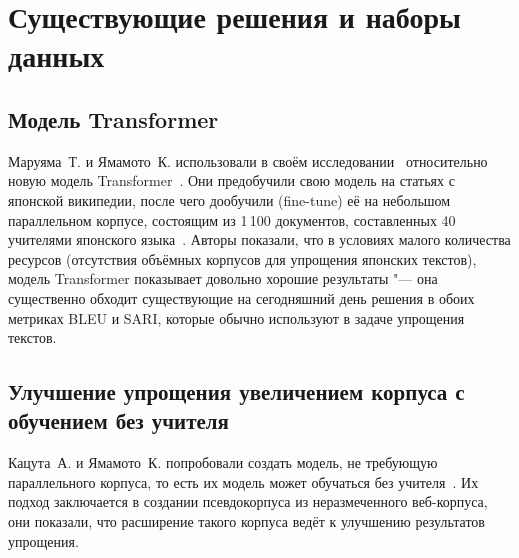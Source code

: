 \section{Существующие решения и наборы данных}








\subsection{Модель Transformer}


Маруяма~Т. и Ямамото~К. использовали в своём исследовании~\cite{Transformer2019} относительно новую модель Transformer~\cite{vaswani2017attention}.
Они предобучили свою модель на статьях с японской википедии, после чего дообучили (fine-tune) её на небольшом параллельном корпусе, состоящим из 1\,100 документов, составленных 40 учителями японского языка~\cite{moku-yamamoto-2012-automatic}.
Авторы показали, что в условиях малого количества ресурсов (отсутствия объёмных корпусов для упрощения японских текстов), модель Transformer показывает довольно хорошие результаты "--- она существенно обходит существующие на сегодняшний день решения в обоих метриках BLEU и SARI, которые обычно используют в задаче упрощения текстов.


\subsection{Улучшение упрощения увеличением корпуса с обучением без учителя}


Кацута~А. и Ямамото~К. попробовали создать модель, не требующую параллельного корпуса, то есть их модель может обучаться без учителя~\cite{Unsupervised2019}.
Их подход заключается в создании псевдокорпуса из неразмеченного веб-корпуса, они показали, что расширение такого корпуса ведёт к улучшению результатов упрощения.


